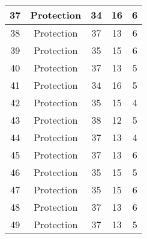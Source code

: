 \documentclass[results.tex]{subfiles}
\begin{document}
\begin{center}
\begin{tabular}{| c || c | c | c | c |}
            \hline
            37                      & Protection                   & 34                     & 16                      & 6                    \\
            \hline
            38                      & Protection                   & 37                     & 13                      & 6                    \\
            \hline
            39                      & Protection                   & 35                     & 15                      & 6                    \\
            \hline
            40                      & Protection                   & 37                     & 13                      & 5                    \\
            \hline
            41                      & Protection                   & 34                     & 16                      & 5                    \\
            \hline
            42                      & Protection                   & 35                     & 15                      & 4                    \\
            \hline
            43                      & Protection                   & 38                     & 12                      & 5                    \\
            \hline
            44                      & Protection                   & 37                     & 13                      & 4                    \\
            \hline
            45                      & Protection                   & 37                     & 13                      & 6                    \\
            \hline
            46                      & Protection                   & 35                     & 15                      & 5                    \\
            \hline
            47                      & Protection                   & 35                     & 15                      & 6                    \\
            \hline
            48                      & Protection                   & 37                     & 13                      & 6                    \\
            \hline
            49                      & Protection                   & 37                     & 13                      & 5                    \\
            \hline
        \end{tabular}
    \end{center}
\end{document}
